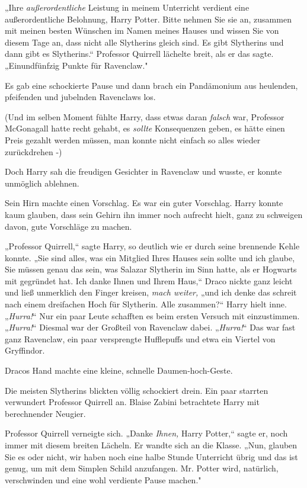 {„Ihre \emph{außerordentliche} Leistung in meinem Unterricht verdient eine außerordentliche Belohnung, Harry Potter. Bitte nehmen Sie sie an, zusammen mit meinen besten Wünschen im Namen meines Hauses und wissen Sie von diesem Tage an, dass nicht alle Slytherins gleich sind. Es gibt Slytherins und dann gibt es Slytherins.“ Professor Quirrell lächelte breit, als er das sagte. „Einundfünfzig Punkte für Ravenclaw."

Es gab eine schockierte Pause und dann brach ein Pandämonium aus heulenden, pfeifenden und jubelnden Ravenclaws los.

(Und im selben Moment fühlte Harry, dass etwas daran \emph{falsch} war, Professor McGonagall hatte recht gehabt, es \emph{sollte} Konsequenzen geben, es hätte einen Preis gezahlt werden müssen, man konnte nicht einfach so alles wieder zurückdrehen -)

Doch Harry sah die freudigen Gesichter in Ravenclaw und wusste, er konnte unmöglich ablehnen.

Sein Hirn machte einen Vorschlag. Es war ein guter Vorschlag. Harry konnte kaum glauben, dass sein Gehirn ihn immer noch aufrecht hielt, ganz zu schweigen davon, gute Vorschläge zu machen.

„Professor Quirrell,“ sagte Harry, so deutlich wie er durch seine brennende Kehle konnte. „Sie sind alles, was ein Mitglied Ihres Hauses sein sollte und ich glaube, Sie müssen genau das sein, was Salazar Slytherin im Sinn hatte, als er Hogwarts mit gegründet hat. Ich danke Ihnen und Ihrem Haus,“ Draco nickte ganz leicht und ließ unmerklich den Finger kreisen, \emph{mach weiter,} „und ich denke das schreit nach einem dreifachen Hoch für Slytherin. Alle zusammen?“ Harry hielt inne. „\emph{Hurra!}“ Nur ein paar Leute schafften es beim ersten Versuch mit einzustimmen. „\emph{Hurra!}“ Diesmal war der Großteil von Ravenclaw dabei. „\emph{Hurra!}“ Das war fast ganz Ravenclaw, ein paar versprengte Hufflepuffs und etwa ein Viertel von Gryffindor.

Dracos Hand machte eine kleine, schnelle Daumen-hoch-Geste.

Die meisten Slytherins blickten völlig schockiert drein. Ein paar starrten verwundert Professor Quirrell an. Blaise Zabini betrachtete Harry mit berechnender Neugier.

Professor Quirrell verneigte sich. „Danke \emph{Ihnen,} Harry Potter,“ sagte er, noch immer mit diesem breiten Lächeln. Er wandte sich an die Klasse. „Nun, glauben Sie es oder nicht, wir haben noch eine halbe Stunde Unterricht übrig und das ist genug, um mit dem Simplen Schild anzufangen. Mr. Potter wird, natürlich, verschwinden und eine wohl verdiente Pause machen."

}
